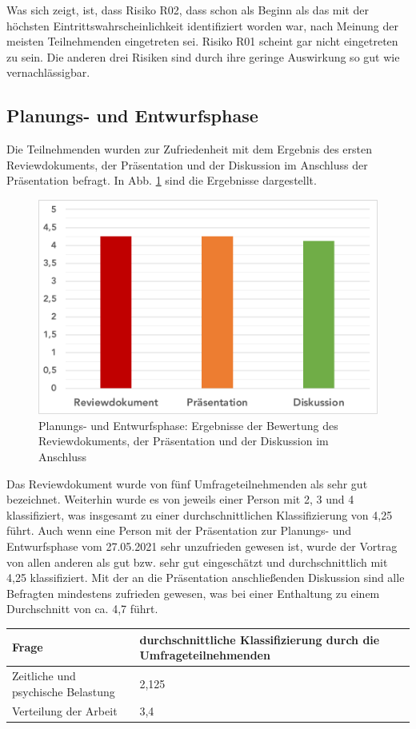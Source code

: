 \documentclass[../review_3.tex]{subfiles}
\begin{document}
Was sich zeigt, ist, dass Risiko R02, dass schon als Beginn als das mit der höchsten Eintrittswahrscheinlichkeit identifiziert worden war, nach Meinung der meisten Teilnehmenden eingetreten sei. Risiko R01 scheint gar nicht eingetreten zu sein. Die anderen drei Risiken sind durch ihre geringe Auswirkung so gut wie vernachlässigbar.

\subsection{Planungs- und Entwurfsphase}
Die Teilnehmenden wurden zur Zufriedenheit mit dem Ergebnis des ersten Reviewdokuments, der Präsentation und der Diskussion im Anschluss der Präsentation befragt. In Abb. \ref{pr1} sind die Ergebnisse dargestellt.
\begin{figure} [h]
    \centering
    \includegraphics[width = 0.7\linewidth]{img/RevPraeDis1.pdf}
    \caption{Planungs- und Entwurfsphase: Ergebnisse der Bewertung des Reviewdokuments, der Präsentation und der Diskussion im Anschluss}
    \label{pr1}
\end{figure}
Das Reviewdokument wurde von fünf Umfrageteilnehmenden als sehr gut bezeichnet. Weiterhin wurde es von jeweils einer Person mit 2, 3 und 4 klassifiziert, was insgesamt zu einer durchschnittlichen Klassifizierung von 4,25 führt. Auch wenn eine Person mit der Präsentation zur Planungs- und Entwurfsphase vom 27.05.2021 sehr unzufrieden gewesen ist, wurde der Vortrag von allen anderen als gut bzw. sehr gut eingeschätzt und durchschnittlich mit 4,25 klassifiziert. Mit der an die Präsentation anschließenden Diskussion sind alle Befragten mindestens zufrieden gewesen, was bei einer Enthaltung zu einem Durchschnitt von ca. 4,7 führt.

\begin{longtable}[H]{p{} p{}}
    \toprule
    \textbf{Frage}                     & \textbf{durchschnittliche Klassifizierung durch die Umfrageteilnehmenden} \\ \midrule \endhead
    Zeitliche und psychische Belastung & 2,125                                                                     \\
    Verteilung der Arbeit              & 3,4                                                                       \\ \bottomrule
\end{longtable}
\end{document}
